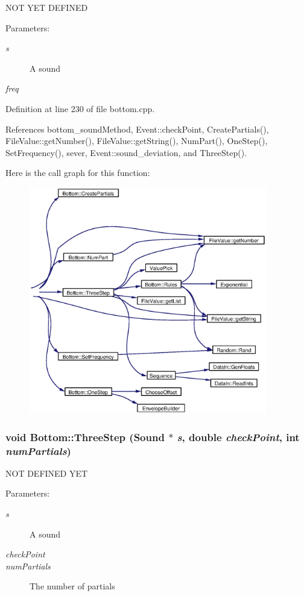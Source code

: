NOT YET DEFINED \begin{Desc}
\item[Parameters:]
\begin{description}
\item[{\em s}]A sound \item[{\em freq}]\end{description}
\end{Desc}


Definition at line 230 of file bottom.cpp.

References bottom\_\-sound\-Method, Event::check\-Point, Create\-Partials(), File\-Value::get\-Number(), File\-Value::get\-String(), Num\-Part(), One\-Step(), Set\-Frequency(), sever, Event::sound\_\-deviation, and Three\-Step().

Here is the call graph for this function:\begin{figure}[H]
\begin{center}
\leavevmode
\includegraphics[width=294pt]{classBottom_a16_cgraph}
\end{center}
\end{figure}
\subsubsection{\setlength{\rightskip}{0pt plus 5cm}void Bottom::Three\-Step (Sound $\ast$ {\em s}, double {\em check\-Point}, int {\em num\-Partials})}\label{classBottom_a20}


NOT DEFINED YET \begin{Desc}
\item[Parameters:]
\begin{description}
\item[{\em s}]A sound \item[{\em check\-Point}]\item[{\em num\-Partials}]The number of partials \end{description}
\end{Desc}



